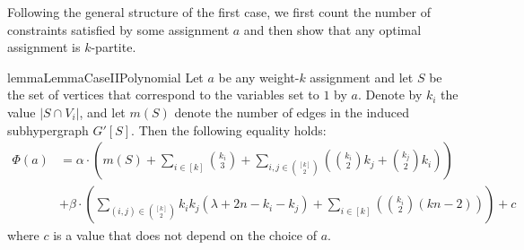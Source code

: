 \documentclass[a4paper,UKenglish,cleveref, autoref, thm-restate,numberwithinsect]{lipics-v2021}
\begin{document}
Following the general structure of the first case, we first count the number of constraints satisfied by some assignment $a$ and then show that any optimal assignment is $k$-partite.
\begin{restatable}{lemma}{LemmaCaseIIPolynomial}\label{lemma:case2-any-assignment}
    Let $a$ be any weight-$k$ assignment and let $S$ be the set of vertices that correspond to the variables set to $1$ by $a$.
    Denote by $k_i$ the value $|S\cap V_i|$, and let $m(S)$ denote the number of edges in the induced subhypergraph $G'[S]$.
    Then the following equality holds:
    \begin{align*}
    \Phi(a) &= \alpha\cdot \left(m(S) + \sum_{i\in [k]}\binom{k_i}{3} + \sum_{i,j\in\binom{[k]}{2}}\left(\binom{k_i}{2}k_j + \binom{k_j}{2}k_i\right)\right) 
    \\ &+ \beta \cdot\left(\sum_{(i,j)\in \binom{[k]}{2}} k_ik_j (\lambda + 2n-k_i-k_j) + \sum_{i\in [k]} \left(\binom{k_i}{2}(kn-2)\right)\right)  + c
\end{align*}
    where $c$ is a value that does not depend on the choice of $a$.
\end{restatable}
\end{document}
